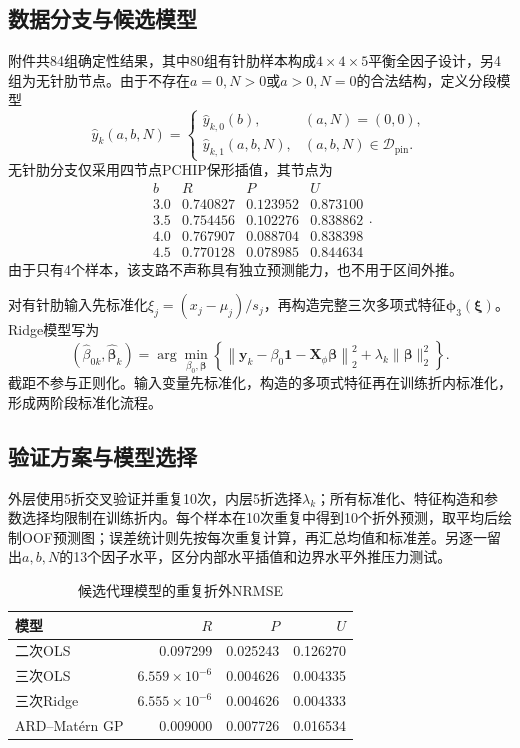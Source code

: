 \documentclass[UTF8,12pt,a4paper]{ctexart}
\begin{document}
\subsection{数据分支与候选模型}
附件共84组确定性结果，其中80组有针肋样本构成$4\times4\times5$平衡全因子设计，另4组为无针肋节点。由于不存在$a=0,N>0$或$a>0,N=0$的合法结构，定义分段模型
\begin{equation}
\widehat y_k(a,b,N)=
\begin{cases}
\widehat y_{k,0}(b),&(a,N)=(0,0),\\
\widehat y_{k,1}(a,b,N),&(a,b,N)\in\mathcal D_{\mathrm{pin}}.
\end{cases}
\end{equation}
无针肋分支仅采用四节点PCHIP保形插值，其节点为
\begin{equation}
\begin{array}{c|ccc}
b&R&P&U\\\hline
3.0&0.740827&0.123952&0.873100\\
3.5&0.754456&0.102276&0.838862\\
4.0&0.767907&0.088704&0.838398\\
4.5&0.770128&0.078985&0.844634
\end{array}.
\end{equation}
由于只有4个样本，该支路不声称具有独立预测能力，也不用于区间外推。

对有针肋输入先标准化$\xi_j=(x_j-\mu_j)/s_j$，再构造完整三次多项式特征$\bm\phi_3(\bm\xi)$。Ridge模型写为
\begin{equation}
(\widehat\beta_{0k},\widehat{\bm\beta}_k)=
\arg\min_{\beta_0,\bm\beta}
\left\{\left\|\bm y_k-\beta_0\bm 1-\bm X_{\phi}\bm\beta\right\|_2^2
+\lambda_k\|\bm\beta\|_2^2\right\}.
\end{equation}
截距不参与正则化。输入变量先标准化，构造的多项式特征再在训练折内标准化，形成两阶段标准化流程。

\subsection{验证方案与模型选择}
外层使用5折交叉验证并重复10次，内层5折选择$\lambda_k$；所有标准化、特征构造和参数选择均限制在训练折内。每个样本在10次重复中得到10个折外预测，取平均后绘制OOF预测图；误差统计则先按每次重复计算，再汇总均值和标准差。另逐一留出$a,b,N$的13个因子水平，区分内部水平插值和边界水平外推压力测试。

\begin{table}[H]\centering\small
\caption{候选代理模型的重复折外NRMSE}
\begin{tabular}{lrrr}
\toprule
模型&$R$&$P$&$U$\\\midrule
二次OLS&0.097299&0.025243&0.126270\\
三次OLS&$6.559\times10^{-6}$&0.004626&0.004335\\
三次Ridge&$6.555\times10^{-6}$&0.004626&0.004333\\
ARD--Mat\'ern GP&0.009000&0.007726&0.016534\\
\bottomrule
\end{tabular}
\end{table}
\end{document}
